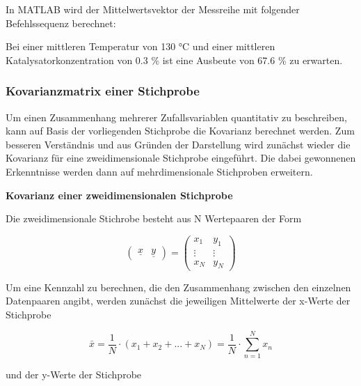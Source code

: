 \noindent In MATLAB wird der Mittelwertsvektor der Messreihe mit folgender Befehlssequenz berechnet:



\noindent Bei einer mittleren Temperatur von 130 $\si{\degree}$C und einer mittleren Katalysatorkonzentration von 0.3 \% ist eine Ausbeute von 67.6 \% zu erwarten.

\clearpage

\subsubsection{Kovarianzmatrix einer Stichprobe}

\noindent Um einen Zusammenhang mehrerer Zufallsvariablen quantitativ zu beschreiben, kann auf Basis der vorliegenden Stichprobe die Kovarianz berechnet werden. Zum besseren Verst\"{a}ndnis und aus Gr\"{u}nden der Darstellung wird zun\"{a}chst wieder die Kovarianz f\"{u}r eine zweidimensionale Stichprobe eingef\"{u}hrt. Die dabei gewonnenen Erkenntnisse werden dann auf mehrdimensionale Stichproben erweitern.

{\selectfont
\noindent\textbf{Kovarianz einer zweidimensionalen Stichprobe}}\smallskip

\noindent Die zweidimensionale Stichrobe besteht aus N Wertepaaren der Form 

\begin{equation}\label{eq:sevenfifteen}
\left(\begin{array}{cc} {\underline{x}} & {\underline{y}} \end{array}\right)=\left(\begin{array}{cc} {x_{1} } & {y_{1} } \\ {\vdots } & {\vdots } \\ {x_{N} } & {y_{N} } \end{array}\right)
\end{equation}

\noindent Um eine Kennzahl zu berechnen, die den Zusammenhang zwischen den einzelnen Datenpaaren angibt, werden zun\"{a}chst die jeweiligen Mittelwerte der x-Werte der Stichprobe 

\begin{equation}\label{eq:sevensixteen}
\bar{x}=\dfrac{1}{N} \cdot \left(x_{1} +x_{2} +...+x_{N} \right)=\dfrac{1}{N} \cdot \sum _{n=1}^{N}x_{n}
\end{equation}

\noindent und der y-Werte der Stichprobe 


